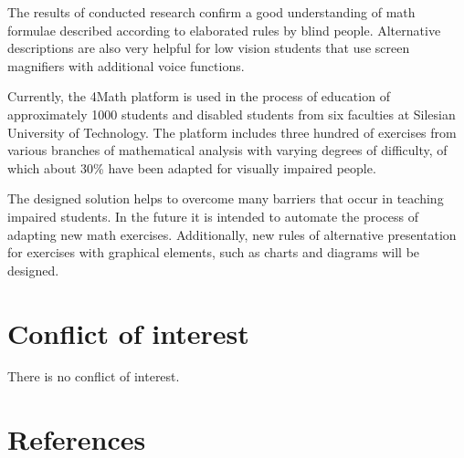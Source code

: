 \documentclass[12pt,1p]{elsarticle}
\begin{document}
	The results of conducted research confirm a good understanding of math formulae described according to elaborated rules by blind people. Alternative descriptions are also very helpful for low vision students that use screen magnifiers with additional voice functions.
	
	Currently, the 4Math platform is used in the process of education of approximately 1000 students and disabled students from six faculties at Silesian University of Technology. The platform includes three hundred of exercises from various branches of mathematical analysis with varying degrees of difficulty, of which about 30\% have been adapted for visually impaired people.
	
	The designed solution helps to overcome many barriers that occur in teaching impaired students. In the future it is intended to automate the process of adapting new math exercises. Additionally, new rules of alternative presentation for exercises with graphical elements, such as charts and diagrams will be designed.

\section{Conflict of interest}
	There is no conflict of interest.

\section*{References}


\end{document}
